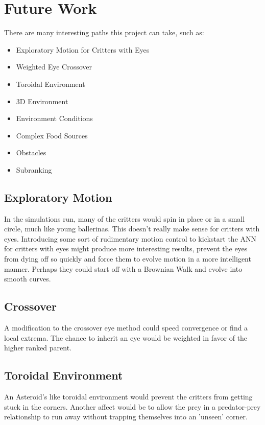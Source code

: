 
\chapter{Future Work}
\label{futureWork}

There are many interesting paths this project can take, such as:

\begin{itemize}[noitemsep]
	\item Exploratory Motion for Critters with Eyes
	\item Weighted Eye Crossover
	\item Toroidal Environment
	\item 3D Environment
	\item Environment Conditions
	\item Complex Food Sources
	\item Obstacles 
	\item Subranking
\end{itemize} 

\section{Exploratory Motion}
In the simulations run, many of the critters would spin in place or in a small circle, much like young ballerinas. This doesn't really make sense for critters with eyes. Introducing some sort of rudimentary motion control to kickstart the ANN for critters with eyes might produce more interesting results, prevent the eyes from dying off so quickly and force them to evolve motion in a more intelligent manner. Perhaps they could start off with a Brownian Walk and evolve into smooth curves. 

\section{Crossover}
A modification to the crossover eye method could speed convergence or find a local extrema.  The chance to inherit an eye would be weighted in favor of the higher ranked parent.  \\

\section{Toroidal Environment}
An Asteroid's like toroidal environment would prevent the critters from getting stuck in the corners. Another affect would be to allow the prey in a predator-prey relationship to run away without trapping themselves into an 'unseen' corner.\\

